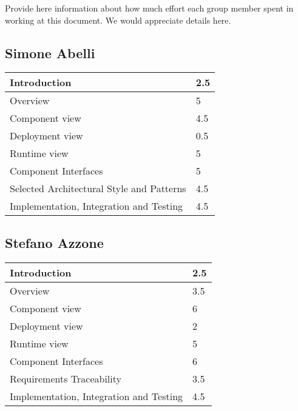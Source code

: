Provide here information about how much effort each group member spent in working at this document. We would appreciate details here.\\

\subsection{Simone Abelli}
\begin{tabular} { | m{5cm} | m{1cm} | }
	\hline
	Introduction & 2.5\\
	\hline
	Overview & 5\\
	\hline
	Component view & 4.5\\
	\hline
	Deployment view & 0.5\\
	\hline
	Runtime view & 5\\
	\hline
	Component Interfaces & 5\\
	\hline
	Selected Architectural Style and Patterns & 4.5\\
	\hline
	Implementation, Integration and Testing & 4.5\\
	\hline
\end{tabular}

\subsection{Stefano Azzone}
\begin{tabular} { | m{5cm} | m{1cm} | }
	\hline
	Introduction & 2.5\\
	\hline
	Overview & 3.5\\
	\hline
	Component view & 6\\
	\hline
	Deployment view & 2\\
	\hline
	Runtime view & 5\\
	\hline
	Component Interfaces & 6\\
	\hline
	Requirements Traceability & 3.5\\
	\hline
	Implementation, Integration and Testing & 4.5\\
	\hline
\end{tabular}